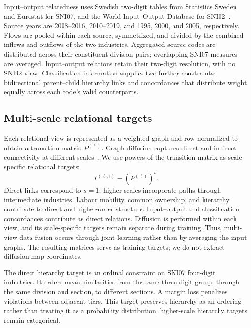 \documentclass[9pt,twocolumn,twoside]{pnas-new}
\begin{document}
Input--output relatedness uses Swedish two-digit tables from Statistics Sweden and Eurostat for SNI07, and the World Input--Output Database for SNI02~\cite{statisticsswedenInputOutputTables2019,eurostat_suiot,timmerIllustratedUserGuide2015}. Source years are 2008--2016, 2010--2019, and 1995, 2000, and 2005, respectively. Flows are pooled within each source, symmetrized, and divided by the combined inflows and outflows of the two industries. Aggregated source codes are distributed across their constituent division pairs; overlapping SNI07 measures are averaged. Input--output relations retain their two-digit resolution, with no SNI92 view. Classification information supplies two further constraints: bidirectional parent--child hierarchy links and concordances that distribute weight equally across each code's valid counterparts.

\subsection{Multi-scale relational targets}
\label{subsec:diffusion-targets}

Each relational view is represented as a weighted graph and row-normalized to obtain a transition matrix $P^{(\ell)}$. Graph diffusion captures direct and indirect connectivity at different scales~\cite{coifmanDiffusionMaps2006,gasteigerDiffusionImprovesGraph2019}. We use powers of the transition matrix as scale-specific relational targets:
\begin{equation}
T^{(\ell,s)}=\left(P^{(\ell)}\right)^s.
\label{eq:layer-diffusion}
\end{equation}
Direct links correspond to $s=1$; higher scales incorporate paths through intermediate industries. Labour mobility, common ownership, and hierarchy contribute to direct and higher-order structure. Input--output and classification concordances contribute as direct relations. Diffusion is performed within each view, and its scale-specific targets remain separate during training. Thus, multi-view data fusion occurs through joint learning rather than by averaging the input graphs. The resulting matrices serve as training targets; we do not extract diffusion-map coordinates.

The direct hierarchy target is an ordinal constraint on SNI07 four-digit industries. It orders mean similarities from the same three-digit group, through the same division and section, to different sections. A margin loss penalizes violations between adjacent tiers. This target preserves hierarchy as an ordering rather than treating it as a probability distribution; higher-scale hierarchy targets remain categorical.
\end{document}
